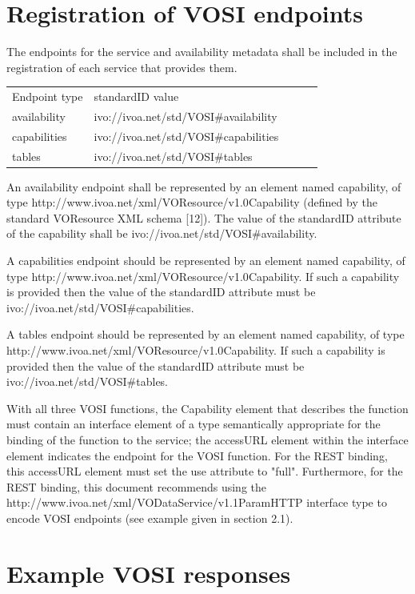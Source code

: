 \documentclass[11pt,letter]{ivoa}
\begin{document}
\section{Registration of VOSI endpoints}

The endpoints for the service and availability metadata shall be included in the registration of each service that provides them.

\begin{tabular}{l l l l l}
\label{tab:registration}
Endpoint type & standardID value \\
availability & ivo://ivoa.net/std/VOSI\#availability \\
capabilities & ivo://ivoa.net/std/VOSI\#capabilities \\
tables & ivo://ivoa.net/std/VOSI\#tables \\
\end{tabular}

An availability endpoint shall be represented by an element named capability, of type {http://www.ivoa.net/xml/VOResource/v1.0}Capability (defined by the standard VOResource XML schema [12]). The value of the standardID attribute of the capability shall be ivo://ivoa.net/std/VOSI\#availability.

A capabilities endpoint should be represented by an element named capability, of type {http://www.ivoa.net/xml/VOResource/v1.0}Capability. If such a capability is provided then the value of the standardID attribute must be ivo://ivoa.net/std/VOSI\#capabilities.

A tables endpoint should be represented by an element named capability, of type {http://www.ivoa.net/xml/VOResource/v1.0}Capability. If such a capability is provided then the value of the standardID attribute must be ivo://ivoa.net/std/VOSI\#tables.

With all three VOSI functions, the Capability element that describes the function must contain an interface element of a type semantically appropriate for the binding of the function to the service; the accessURL element within the interface element indicates the endpoint for the VOSI function. For the REST binding, this accessURL element must set the use attribute to "full". Furthermore, for the REST binding, this document recommends using the {http://www.ivoa.net/xml/VODataService/v1.1}ParamHTTP interface type to encode VOSI endpoints (see example given in section 2.1). 

\section{Example VOSI responses}
\end{document}
